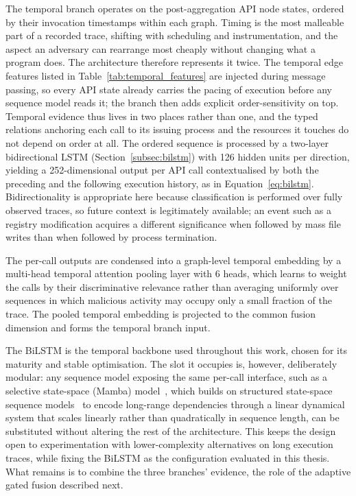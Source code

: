 \documentclass[%
    BCOR=10mm,
    DIV=13,
    toc=bibliography,
    toc=listof,
    oneside,
    12pt,
]{scrbook}
\begin{document}
The temporal branch operates on the post-aggregation API node states, ordered
by their invocation timestamps within each graph. Timing is the most malleable
part of a recorded trace, shifting with scheduling and instrumentation, and the
aspect an adversary can rearrange most cheaply without changing what a program
does. The architecture therefore represents it twice. The temporal edge
features listed in Table~\ref{tab:temporal_features} are injected during
message passing, so every API state already carries the pacing of execution
before any sequence model reads it; the branch then adds explicit
order-sensitivity on top. Temporal evidence thus lives in two places rather
than one, and the typed relations anchoring each call to its issuing process
and the resources it touches do not depend on order at all. The ordered
sequence is processed by a two-layer bidirectional LSTM
(Section~\ref{subsec:bilstm}) with 126 hidden units per direction, yielding a
252-dimensional output per API call contextualised by both the preceding and
the following execution history, as in Equation~\ref{eq:bilstm}. Bidirectionality is appropriate here because
classification is performed over fully observed traces, so future context is
legitimately available; an event such as a registry modification acquires a
different significance when followed by mass file writes than when followed by
process termination.

The per-call outputs are condensed into a graph-level temporal embedding by a
multi-head temporal attention pooling layer with 6 heads, which learns to
weight the calls by their discriminative relevance rather than averaging
uniformly over sequences in which malicious activity may occupy only a small
fraction of the trace. The pooled temporal embedding is
projected to the common fusion dimension and forms the temporal branch input.

The BiLSTM is the temporal backbone used throughout this work, chosen for its
maturity and stable optimisation. The slot it occupies is, however,
deliberately modular: any sequence model exposing the same per-call interface,
such as a selective state-space (Mamba) model~\cite{gu2023mamba}, which builds
on structured state-space sequence models~\cite{gu2022s4} to encode long-range
dependencies through a linear dynamical system that scales linearly rather than
quadratically in sequence length, can be substituted without altering the rest
of the architecture. This keeps the design open to experimentation with
lower-complexity alternatives on long execution traces, while fixing the BiLSTM
as the configuration evaluated in this thesis. What remains is to combine the
three branches' evidence, the role of the adaptive gated fusion described
next.
\end{document}
